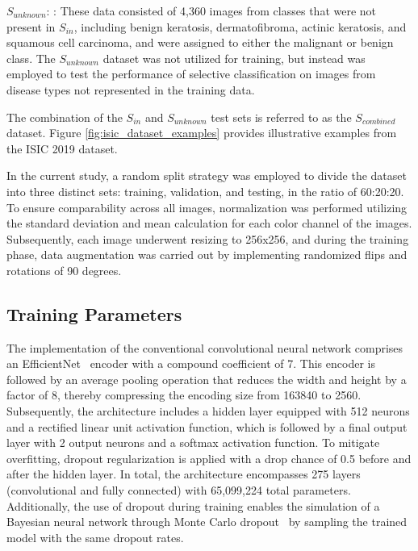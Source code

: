 $S_{unknown}$: : These data consisted of 4,360 images from classes that were not present in $S_{in}$, including benign keratosis, dermatofibroma, actinic keratosis, and squamous cell carcinoma, and were assigned to either the malignant or benign class. The $S_{unknown}$ dataset was not utilized for training, but instead was employed to test the performance of selective classification on images from disease types not represented in the training data.

The combination of the $S_{in}$ and $S_{unknown}$ test sets is referred to as the $S_{combined}$ dataset. Figure \ref{fig:isic_dataset_examples} provides illustrative examples from the ISIC 2019 dataset.

In the current study, a random split strategy was employed to divide the dataset into three distinct sets: training, validation, and testing, in the ratio of 60:20:20. To ensure comparability across all images, normalization was performed utilizing the standard deviation and mean calculation for each color channel of the images. Subsequently, each image underwent resizing to 256x256, and during the training phase, data augmentation was carried out by implementing randomized flips and rotations of 90 degrees.

\subsection{Training Parameters}
\label{subsec:selective_binary_training}
The implementation of the conventional convolutional neural network comprises an EfficientNet~\citep{tan2019efficient} encoder with a compound coefficient of 7. This encoder is followed by an average pooling operation that reduces the width and height by a factor of 8, thereby compressing the encoding size from 163840 to 2560. Subsequently, the architecture includes a hidden layer equipped with 512 neurons and a rectified linear unit activation function, which is followed by a final output layer with 2 output neurons and a softmax activation function. To mitigate overfitting, dropout regularization is applied with a drop chance of 0.5 before and after the hidden layer. In total, the architecture encompasses 275 layers (convolutional and fully connected) with 65,099,224 total parameters. Additionally, the use of dropout during training enables the simulation of a Bayesian neural network through Monte Carlo dropout~\citep{gal2016dropout} by sampling the trained model with the same dropout rates.


